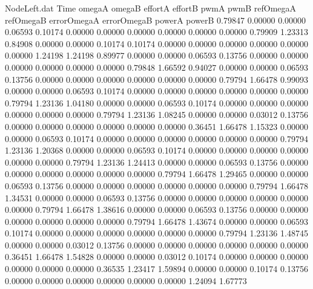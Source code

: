 \begin{filecontents}{NodeLeft.dat}
Time omegaA omegaB effortA effortB pwmA pwmB refOmegaA refOmegaB errorOmegaA errorOmegaB powerA powerB
   0.79847    0.00000    0.00000     0.06593    0.10174    0.00000    0.00000    0.00000    0.00000    0.00000    0.00000    0.79909    1.23313
   0.84908    0.00000    0.00000     0.10174    0.10174    0.00000    0.00000    0.00000    0.00000    0.00000    0.00000    1.24198    1.24198
   0.89977    0.00000    0.00000     0.06593    0.13756    0.00000    0.00000    0.00000    0.00000    0.00000    0.00000    0.79848    1.66592
   0.94027    0.00000    0.00000     0.06593    0.13756    0.00000    0.00000    0.00000    0.00000    0.00000    0.00000    0.79794    1.66478
   0.99093    0.00000    0.00000     0.06593    0.10174    0.00000    0.00000    0.00000    0.00000    0.00000    0.00000    0.79794    1.23136
   1.04180    0.00000    0.00000     0.06593    0.10174    0.00000    0.00000    0.00000    0.00000    0.00000    0.00000    0.79794    1.23136
   1.08245    0.00000    0.00000     0.03012    0.13756    0.00000    0.00000    0.00000    0.00000    0.00000    0.00000    0.36451    1.66478
   1.15323    0.00000    0.00000     0.06593    0.10174    0.00000    0.00000    0.00000    0.00000    0.00000    0.00000    0.79794    1.23136
   1.20368    0.00000    0.00000     0.06593    0.10174    0.00000    0.00000    0.00000    0.00000    0.00000    0.00000    0.79794    1.23136
   1.24413    0.00000    0.00000     0.06593    0.13756    0.00000    0.00000    0.00000    0.00000    0.00000    0.00000    0.79794    1.66478
   1.29465    0.00000    0.00000     0.06593    0.13756    0.00000    0.00000    0.00000    0.00000    0.00000    0.00000    0.79794    1.66478
   1.34531    0.00000    0.00000     0.06593    0.13756    0.00000    0.00000    0.00000    0.00000    0.00000    0.00000    0.79794    1.66478
   1.38616    0.00000    0.00000     0.06593    0.13756    0.00000    0.00000    0.00000    0.00000    0.00000    0.00000    0.79794    1.66478
   1.43674    0.00000    0.00000     0.06593    0.10174    0.00000    0.00000    0.00000    0.00000    0.00000    0.00000    0.79794    1.23136
   1.48745    0.00000    0.00000     0.03012    0.13756    0.00000    0.00000    0.00000    0.00000    0.00000    0.00000    0.36451    1.66478
   1.54828    0.00000    0.00000     0.03012    0.10174    0.00000    0.00000    0.00000    0.00000    0.00000    0.00000    0.36535    1.23417
   1.59894    0.00000    0.00000     0.10174    0.13756    0.00000    0.00000    0.00000    0.00000    0.00000    0.00000    1.24094    1.67773

\end{filecontents}
